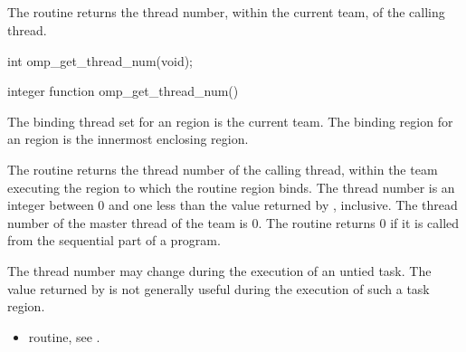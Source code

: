\newpage %

\subsection{}
\label{subsec:omp_get_thread_num}
\summary
The  routine returns the thread number, within the current 
team, of the calling thread.

\format
\begin{ccppspecific}
\begin{boxedcode}
int omp\_get\_thread\_num(void); 
\end{boxedcode}
\end{ccppspecific}

\begin{fortranspecific}
\begin{boxedcode}
integer function omp\_get\_thread\_num() 
\end{boxedcode}
\end{fortranspecific}

\binding
The binding thread set for an  region is the current team. The 
binding region for an  region is the innermost enclosing 
 region. 

\effect
The  routine returns the thread number of the calling thread, 
within the team executing the  region to which the routine region binds. The 
thread number is an integer between 0 and one less than the value returned by 
, inclusive. The thread number of the master thread of the 
team is 0. The routine returns 0 if it is called from the sequential part of a program.

\begin{note}
The thread number may change during the execution of an untied task. The 
value returned by  is not generally useful during the execution 
of such a task region.
\end{note}

\crossreferences
\begin{itemize}
\item {} routine, see 
.
\end{itemize}








